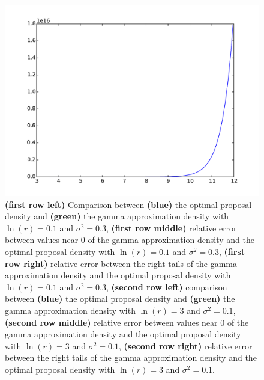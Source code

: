 \documentclass{article}
\begin{document}
\begin{figure}[htb]
\begin{minipage}{.3\textwidth}
	\end{minipage}
	\begin{minipage}{.3\textwidth}
		\centering
		\includegraphics[width=0.97\linewidth]{bootstrap-filter/relative_tail_complex_3_1.pdf}
	\end{minipage}
	\caption{\textbf{(first row left)} Comparison between \textbf{(blue)} the optimal proposal density and \textbf{(green)} the gamma approximation density with $\ln(r)=0.1$ and $\sigma^2 = 0.3$, \textbf{(first row middle)} relative error between values near 0 of the gamma approximation density and the optimal proposal density with $\ln(r)=0.1$ and $\sigma^2 = 0.3$, \textbf{(first row right)} relative error between the right tails of the gamma approximation density and the optimal proposal density with $\ln(r)=0.1$ and $\sigma^2 = 0.3$, \textbf{(second row left)} comparison between \textbf{(blue)} the optimal proposal density and \textbf{(green)} the gamma approximation density with $\ln(r)=3$ and $\sigma^2 = 0.1$, \textbf{(second row middle)} relative error between values near 0 of the gamma approximation density and the optimal proposal density with $\ln(r)=3$ and $\sigma^2 = 0.1$, \textbf{(second row right)} relative error between the right tails of the gamma approximation density and the optimal proposal density with $\ln(r)=3$ and $\sigma^2 = 0.1$.}
	\label{fig:movingcomplex}
\end{figure}
\end{document}
